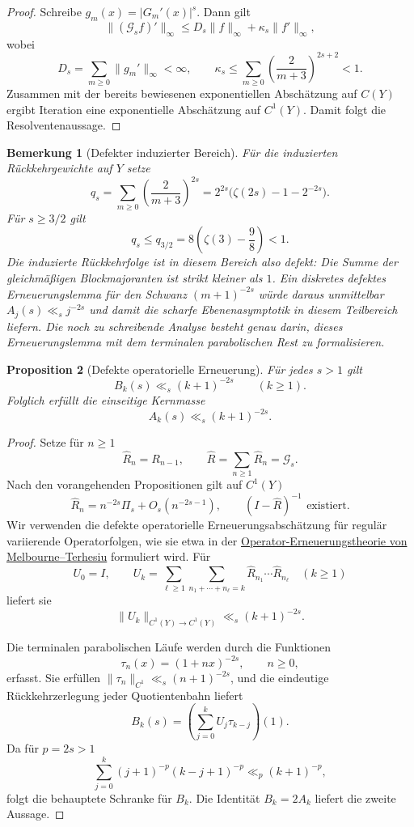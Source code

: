 \documentclass[11pt,a4paper]{article}
\newtheorem{remark}{Bemerkung}[section]
\newtheorem{proposition}[remark]{Proposition}
\begin{document}
\begin{proof}
Schreibe $g_m(x)=|G_m'(x)|^s$. Dann gilt
\[
 \|(\mathcal G_sf)'\|_\infty
 \le D_s\|f\|_\infty+\kappa_s\|f'\|_\infty,
\]
wobei
\[
 D_s=\sum_{m\ge0}\|g_m'\|_\infty<\infty,
 \qquad
 \kappa_s\le
 \sum_{m\ge0}\left(\frac2{m+3}\right)^{2s+2}<1.
\]
Zusammen mit der bereits bewiesenen exponentiellen Abschätzung auf
$C(Y)$ ergibt Iteration eine exponentielle Abschätzung auf $C^1(Y)$.
Damit folgt die Resolventenaussage.
\end{proof}

\begin{remark}[Defekter induzierter Bereich]
Für die induzierten Rückkehrgewichte auf $Y$ setze
\[
 q_s=\sum_{m\ge0}
 \left(\frac{2}{m+3}\right)^{2s}
 =2^{2s}\bigl(\zeta(2s)-1-2^{-2s}\bigr).
\]
Für $s\ge3/2$ gilt
\[
 q_s\le q_{3/2}
 =8\left(\zeta(3)-\frac98\right)
 <1.
\]
Die induzierte Rückkehrfolge ist in diesem Bereich also defekt: Die
Summe der gleichmäßigen Blockmajoranten ist strikt kleiner als $1$.
Ein diskretes defektes Erneuerungslemma für den Schwanz
$(m+1)^{-2s}$ würde daraus unmittelbar
$A_j(s)\ll_s j^{-2s}$ und damit die scharfe Ebenenasymptotik in diesem
Teilbereich liefern. Die noch zu schreibende Analyse besteht genau darin,
dieses Erneuerungslemma mit dem terminalen parabolischen Rest zu
formalisieren.
\end{remark}

\begin{proposition}[Defekte operatorielle Erneuerung]
Für jedes $s>1$ gilt
\[
 B_k(s)\ll_s(k+1)^{-2s}
 \qquad(k\ge1).
\]
Folglich erfüllt die einseitige Kernmasse
\[
 A_k(s)\ll_s(k+1)^{-2s}.
\]
\end{proposition}

\begin{proof}
Setze für $n\ge1$
\[
 \widehat R_n=R_{n-1},
 \qquad
 \widehat R=\sum_{n\ge1}\widehat R_n=\mathcal G_s.
\]
Nach den vorangehenden Propositionen gilt auf $C^1(Y)$
\[
 \widehat R_n=n^{-2s}\Pi_s+O_s(n^{-2s-1}),
 \qquad
 (I-\widehat R)^{-1}\ \,\text{existiert}.
\]
Wir verwenden die defekte operatorielle Erneuerungsabschätzung für
regulär variierende Operatorfolgen, wie sie etwa in der
\href{https://arxiv.org/abs/1008.4113}{Operator-Erneuerungstheorie von
Melbourne--Terhesiu} formuliert wird. Für
\[
 U_0=I,
 \qquad
 U_k=\sum_{\ell\ge1}
 \sum_{n_1+\cdots+n_\ell=k}
 \widehat R_{n_1}\cdots\widehat R_{n_\ell}
 \quad(k\ge1)
\]
liefert sie
\[
 \|U_k\|_{C^1(Y)\to C^1(Y)}
 \ll_s(k+1)^{-2s}.
\]

Die terminalen parabolischen Läufe werden durch die Funktionen
\[
 \tau_n(x)=(1+nx)^{-2s},
 \qquad n\ge0,
\]
erfasst. Sie erfüllen
$\|\tau_n\|_{C^1}\ll_s(n+1)^{-2s}$, und die eindeutige
Rückkehrzerlegung jeder Quotientenbahn liefert
\[
 B_k(s)
 =
 \left(
 \sum_{j=0}^kU_j\tau_{k-j}
 \right)(1).
\]
Da für $p=2s>1$
\[
 \sum_{j=0}^k
 (j+1)^{-p}(k-j+1)^{-p}
 \ll_p(k+1)^{-p},
\]
folgt die behauptete Schranke für $B_k$. Die Identität
$B_k=2A_k$ liefert die zweite Aussage.
\end{proof}
\end{document}
